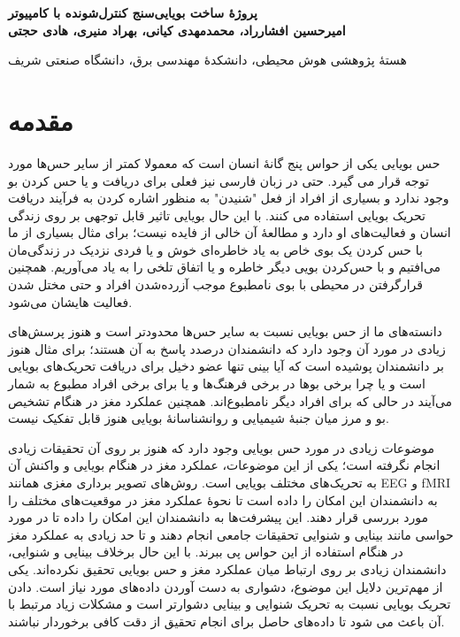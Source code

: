 \documentclass[oneside]{report}
\begin{document}
\thispagestyle{empty}
\begin{flushright}
\vspace*{4cm}
{\Large \bf پروژهٔ ساخت بویایی‌سنج کنترل‌شونده با کامپیوتر}\\
{\bf
امیرحسین افشارراد، محمد‌مهدی کیانی، بهراد منیری، هادی حجتی
}


هستهٔ پژوهشی هوش محیطی، دانشکدهٔ مهندسی برق، دانشگاه صنعتی شریف

\end{flushright}
\vspace {.5cm}


\paragraphfootnotes
\section*{مقدمه}
حس بویایی یکی از حواس پنج گانهٔ انسان است که معمولا کمتر از سایر حس‌ها مورد توجه قرار می گیرد. حتی در زبان فارسی نیز فعلی برای دریافت و یا حس کردن بو وجود ندارد و بسیاری از افراد از فعل "شنیدن" به منظور اشاره کردن به فرآیند دریافت تحریک بویایی استفاده می کنند.
با این حال بویایی تاثیر قابل توجهی بر روی زندگی انسان و فعالیت‌های او دارد و مطالعهٔ آن خالی از فایده نیست؛ برای مثال بسیاری از ما با حس کردن یک بوی خاص به یاد خاطره‌ای خوش و یا فردی نزدیک در زندگی‌مان می‌افتیم و با حس‌کردن بویی دیگر خاطره و یا اتفاق تلخی را به یاد می‌آوریم. همچنین قرار‌گرفتن در محیطی با بوی نامطبوع موجب آزرده‌شدن افراد و حتی مختل شدن فعالیت هایشان می‌شود.


دانسته‌های ما از حس بویایی نسبت به سایر حس‌ها محدود‌تر است و هنوز پرسش‌های زیادی در مورد آن وجود دارد که دانشمندان درصدد پاسخ به آن هستند؛ برای مثال هنوز بر دانشمندان پوشیده است که آیا بینی تنها عضو دخیل برای دریافت تحریک‌های
بویایی است و یا چرا برخی بوها در برخی فرهنگ‌ها و یا برای برخی افراد مطبوع به شمار می‌آیند در حالی که برای افراد دیگر نامطبوع‌اند. همچنین عملکرد مغز در هنگام تشخیص بو و مرز میان جنبهٔ شیمیایی و روانشناسانهٔ بویایی هنوز قابل تفکیک نیست.


موضوعات زیادی در مورد حس بویایی وجود دارد که هنوز بر روی آن تحقیقات زیادی انجام نگرفته است؛ یکی از این موضوعات، عملکرد مغز در هنگام بویایی و واکنش آن به تحریک‌های مختلف بویایی است. روش‌های تصویر برداری مغزی همانند EEG و fMRI به دانشمندان این امکان را داده است تا نحوهٔ عملکرد مغز در موقعیت‌های مختلف را مورد بررسی قرار دهند. این پیشرفت‌ها به دانشمندان این امکان را داده تا در مورد حواسی مانند بینایی و شنوایی تحقیقات جامعی انجام دهند و تا حد زیادی به عملکرد مغز در هنگام استفاده از این حواس پی ببرند. با این حال برخلاف بینایی و شنوایی، دانشمندان زیادی بر روی ارتباط میان عملکرد مغز و حس بویایی تحقیق نکرده‌اند. یکی از مهم‌ترین دلایل این موضوع، دشواری به دست آوردن داده‌های مورد نیاز است. دادن تحریک بویایی نسبت به تحریک شنوایی و بینایی دشوارتر است و مشکلات زیاد مرتبط با آن باعث می شود تا داده‌های حاصل برای انجام تحقیق از دقت کافی برخوردار نباشند.
\end{document}
